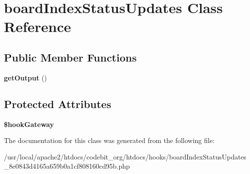 \hypertarget{classboard_index_status_updates}{\section{board\-Index\-Status\-Updates Class Reference}
\label{classboard_index_status_updates}
}
\subsection*{Public Member Functions}
\begin{DoxyCompactItemize}
\item 
\hypertarget{classboard_index_status_updates_aefad4c11248b7c6fa6581c25d82bf9c6}{{\bfseries get\-Output} ()}\label{classboard_index_status_updates_aefad4c11248b7c6fa6581c25d82bf9c6}

\end{DoxyCompactItemize}
\subsection*{Protected Attributes}
\begin{DoxyCompactItemize}
\item 
\hypertarget{classboard_index_status_updates_a0397821147837abb8dcde1316b290088}{{\bfseries \$hook\-Gateway}}\label{classboard_index_status_updates_a0397821147837abb8dcde1316b290088}

\end{DoxyCompactItemize}


The documentation for this class was generated from the following file\-:\begin{DoxyCompactItemize}
\item 
/usr/local/apache2/htdocs/codebit\-\_\-org/htdocs/hooks/board\-Index\-Status\-Updates\-\_\-8e0843d4165a659b0a1cf808160cd95b.\-php\end{DoxyCompactItemize}
